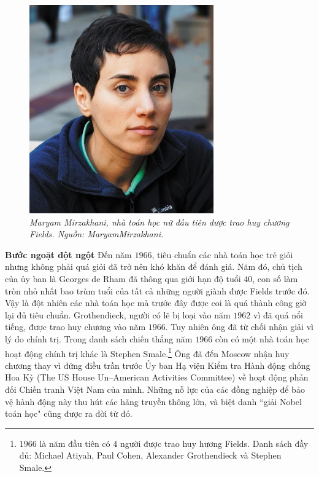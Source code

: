 \begin{multicols}{2}
\begin{figure}[H]
		\includegraphics[width= 0.85\linewidth]{MaryamMirzakhani}
		\caption{\small\textit{\color{lichsutoanhoc}Maryam Mirzakhani, nhà toán học nữ đầu tiên được trao huy chương Fields. Nguồn: MaryamMirzakhani.}}
		\vspace*{-10pt}
	\end{figure}
	\textbf{\color{lichsutoanhoc}Bước ngoặt đột ngột}
	\vskip 0.05cm
	Đến năm $1966$, tiêu chuẩn các nhà toán học trẻ giỏi nhưng không phải quá giỏi đã trở nên khó khăn để đánh giá. Năm đó, chủ tịch của ủy ban là Georges de Rham đã thông qua giới hạn độ tuổi $40$, con số làm tròn nhỏ nhất bao trùm tuổi của tất cả những người giành được Fields trước đó. 
	\vskip 0.05cm
	Vậy là đột nhiên các nhà toán học mà trước đây được coi là quá thành công giờ lại đủ tiêu chuẩn. Grothendieck, người có lẽ bị loại vào năm $1962$ vì đã quá nổi tiếng, được trao huy chương vào năm $1966$. Tuy nhiên ông đã từ chối nhận giải vì lý do chính trị.
	\vskip 0.05cm
	Trong danh sách chiến thắng năm $1966$ còn có một nhà toán học hoạt động chính trị khác là Stephen Smale.\footnote[12]{\color{lichsutoanhoc}$1966$ là năm đầu tiên có $4$ người được trao huy hương Fields. Danh sách đầy đủ: Michael Atiyah, Paul Cohen, Alexander Grothendieck và Stephen Smale.}
	Ông đã đến Moscow nhận huy chương thay vì đứng điều trần trước Ủy ban Hạ viện Kiểm tra Hành động chống Hoa Kỳ (The US House Un--American Activities Committee) về hoạt động phản đối Chiến tranh Việt Nam của mình. Những nỗ lực của các đồng nghiệp để bảo vệ hành động này thu hút các hãng truyền thông lớn, và biệt danh ``giải Nobel toán học" cũng được ra đời từ đó.

\end{multicols}
